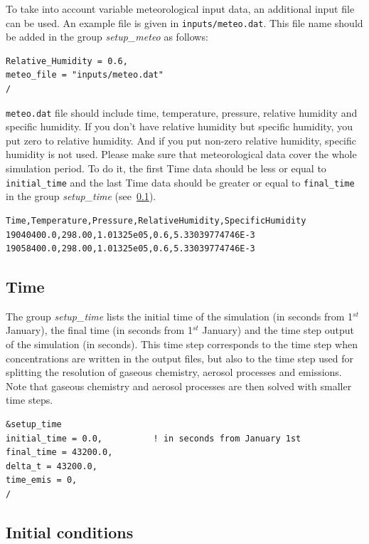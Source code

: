 \documentclass[a4paper,11pt]{article}
\newcommand{\code}[1]{\texttt{#1}}
\begin{document}
To take into account variable meteorological input data, an additional input file can be used. An example file is given in \code{inputs/meteo.dat}. This file name should be added in the group {\textit{setup\_meteo}} as follows: 

\begin{verbatim}
Relative_Humidity = 0.6,
meteo_file = "inputs/meteo.dat"
/
\end{verbatim}

\code{meteo.dat} file should include time, temperature, pressure, relative humidity and specific humidity. 
If you don't have relative humidity but specific humidity, you put zero to relative humidity. And if you put non-zero relative humidity, specific humidity is not used. 
Please make sure that meteorological data cover the whole simulation period. To do it, the first Time data should be less or equal to \code{initial\_time} and the last Time data should be greater or equal to \code{final\_time} in the group  {\textit{setup\_time}} (see~\ref{sec:time}).


\begin{verbatim}
Time,Temperature,Pressure,RelativeHumidity,SpecificHumidity
19040400.0,298.00,1.01325e05,0.6,5.33039774746E-3    
19058400.0,298.00,1.01325e05,0.6,5.33039774746E-3
\end{verbatim}


\subsection{Time}\label{sec:time}

The group {\textit{setup\_time}} lists the initial time of the simulation (in seconds from 1$^{st}$ January), the final time (in seconds from 1$^{st}$ January) and the time step output of the simulation (in seconds). This time step corresponds to the time step when concentrations are written in the output files, but also to the time step used for splitting the resolution of gaseous chemistry, aerosol processes and emissions. Note that gaseous chemistry and aerosol processes are then solved with smaller time steps.

\begin{verbatim}
&setup_time
initial_time = 0.0,          ! in seconds from January 1st   
final_time = 43200.0,             
delta_t = 43200.0,                 
time_emis = 0,        	 
/
\end{verbatim}

\subsection{Initial conditions}
 
\end{document}
